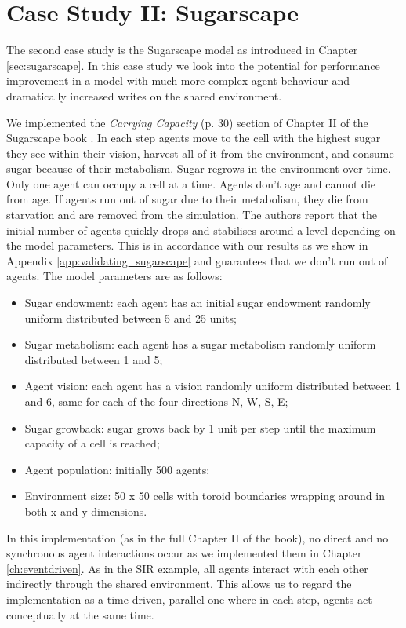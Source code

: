 \section{Case Study II: Sugarscape}
\label{sec:sugarscape_concurrent}
The second case study is the Sugarscape model as introduced in Chapter \ref{sec:sugarscape}. In this case study we look into the potential for performance improvement in a model with much more complex agent behaviour and dramatically increased writes on the shared environment.

We implemented the \textit{Carrying Capacity} (p. 30) section of Chapter II of the Sugarscape book \cite{epstein_growing_1996}. In each step agents move to the cell with the highest sugar they see within their vision, harvest all of it from the environment, and consume sugar because of their metabolism. Sugar regrows in the environment over time. Only one agent can occupy a cell at a time. Agents don't age and cannot die from age. If agents run out of sugar due to their metabolism, they die from starvation and are removed from the simulation. The authors report that the initial number of agents quickly drops and stabilises around a level depending on the model parameters. This is in accordance with our results as we show in Appendix \ref{app:validating_sugarscape} and guarantees that we don't run out of agents. The model parameters are as follows:

\begin{itemize}
	\item Sugar endowment: each agent has an initial sugar endowment randomly uniform distributed between 5 and 25 units;
	\item Sugar metabolism: each agent has a sugar metabolism randomly uniform distributed between 1 and 5;
	\item Agent vision: each agent has a vision randomly uniform distributed between 1 and 6, same for each of the four directions N, W, S, E;
	\item Sugar growback: sugar grows back by 1 unit per step until the maximum capacity of a cell is reached;
	\item Agent population: initially 500 agents;
	\item Environment size: 50 x 50 cells with toroid boundaries wrapping around in both x and y dimensions.
\end{itemize}

In this implementation (as in the full Chapter II of the book), no direct and no synchronous agent interactions occur as we implemented them in Chapter \ref{ch:eventdriven}. As in the SIR example, all agents interact with each other indirectly through the shared environment. This allows us to regard the implementation as a time-driven, parallel one where in each step, agents act conceptually at the same time.

